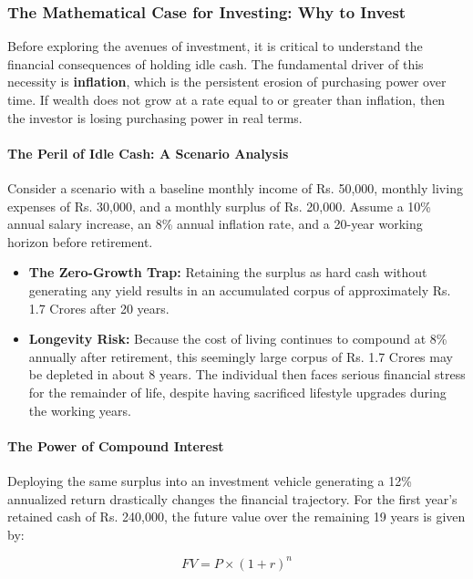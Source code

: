 \documentclass[12pt,openany]{book}
\begin{document}
\subsubsection{The Mathematical Case for Investing: Why to Invest}
Before exploring the avenues of investment, it is critical to understand the financial consequences of holding idle cash. The fundamental driver of this necessity is \textbf{inflation}, which is the persistent erosion of purchasing power over time. If wealth does not grow at a rate equal to or greater than inflation, then the investor is losing purchasing power in real terms.

\paragraph{The Peril of Idle Cash: A Scenario Analysis}
Consider a scenario with a baseline monthly income of Rs. 50,000, monthly living expenses of Rs. 30,000, and a monthly surplus of Rs. 20,000. Assume a 10\% annual salary increase, an 8\% annual inflation rate, and a 20-year working horizon before retirement.

\begin{itemize}[leftmargin=*]
    \item \textbf{The Zero-Growth Trap:} Retaining the surplus as hard cash without generating any yield results in an accumulated corpus of approximately Rs. 1.7 Crores after 20 years.
    \item \textbf{Longevity Risk:} Because the cost of living continues to compound at 8\% annually after retirement, this seemingly large corpus of Rs. 1.7 Crores may be depleted in about 8 years. The individual then faces serious financial stress for the remainder of life, despite having sacrificed lifestyle upgrades during the working years.
\end{itemize}

\paragraph{The Power of Compound Interest}
Deploying the same surplus into an investment vehicle generating a 12\% annualized return drastically changes the financial trajectory. For the first year's retained cash of Rs. 240,000, the future value over the remaining 19 years is given by:

\begin{equation*}
    FV = P \times (1 + r)^n
\end{equation*}
\end{document}
